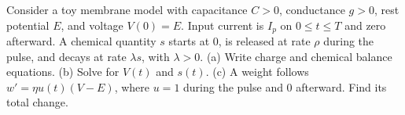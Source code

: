Consider a toy membrane model with capacitance $ C>0 $, conductance $ g>0 $, rest potential $ E $, and voltage $ V(0)=E $. Input current is $ I_p $ on $ 0\le t\le T $ and zero afterward. A chemical quantity $ s $ starts at 0, is released at rate $\rho $ during the pulse, and decays at rate $\lambda s $, with $\lambda>0 $. (a) Write charge and chemical balance equations. (b) Solve for $ V(t)$ and $ s(t)$. (c) A weight follows $ w\prime=\eta u(t)(V-E)$, where $ u=1 $ during the pulse and 0 afterward. Find its total change.
